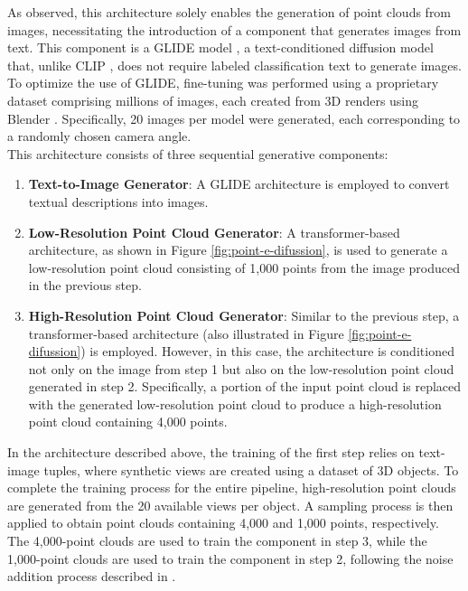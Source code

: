 \documentclass[journal]{IEEEtran}
\begin{document}
As observed, this architecture solely enables the generation of point clouds from images, necessitating the introduction of a component that generates images from text. This component is a GLIDE model \cite{nichol2022glide}, a text-conditioned diffusion model that, unlike CLIP \cite{radford2021learning}, does not require labeled classification text to generate images. To optimize the use of GLIDE, fine-tuning was performed using a proprietary dataset comprising millions of images, each created from 3D renders using Blender \cite{blender}. Specifically, 20 images per model were generated, each corresponding to a randomly chosen camera angle.
\\

This architecture consists of three sequential generative components:
\begin{enumerate}
\item \textbf{Text-to-Image Generator}: A GLIDE architecture is employed to convert textual descriptions into images.
\item \textbf{Low-Resolution Point Cloud Generator}: A transformer-based architecture, as shown in Figure \ref{fig:point-e-difussion}, is used to generate a low-resolution point cloud consisting of 1,000 points from the image produced in the previous step.
\item \textbf{High-Resolution Point Cloud Generator}: Similar to the previous step, a transformer-based architecture (also illustrated in Figure \ref{fig:point-e-difussion}) is employed. However, in this case, the architecture is conditioned not only on the image from step 1 but also on the low-resolution point cloud generated in step 2. Specifically, a portion of the input point cloud is replaced with the generated low-resolution point cloud to produce a high-resolution point cloud containing 4,000 points. \\
\end{enumerate}

In the architecture described above, the training of the first step relies on text-image tuples, where synthetic views are created using a dataset of 3D objects. To complete the training process for the entire pipeline, high-resolution point clouds are generated from the 20 available views per object. A sampling process is then applied to obtain point clouds containing 4,000 and 1,000 points, respectively. The 4,000-point clouds are used to train the component in step 3, while the 1,000-point clouds are used to train the component in step 2, following the noise addition process described in \cite{ho2020denoising}. \\
\end{document}
